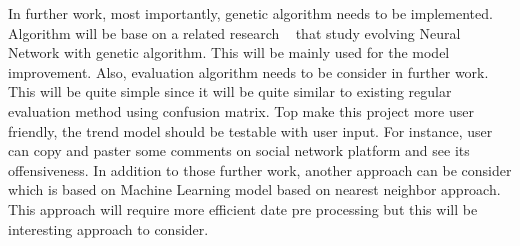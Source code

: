 \documentclass[12pt, natbib=false]{article}
\begin{document}
In further work, most importantly, genetic algorithm needs to be implemented.
Algorithm will be base on a related research ~\cite{andersen2021evolving} that study evolving Neural Network with genetic algorithm.
This will be mainly used for the model improvement.
Also, evaluation algorithm needs to be consider in further work.
This will be quite simple since it will be quite similar to existing regular evaluation method using confusion matrix.
Top make this project more user friendly, the trend model should be testable with user input. For instance, user can copy and paster some comments on social network platform and see its offensiveness.
In addition to those further work, another approach can be consider which is based on Machine Learning model based on nearest neighbor approach.
This approach will require more efficient date pre processing but this will be interesting approach to consider.


\printbibliography
\end{document}
